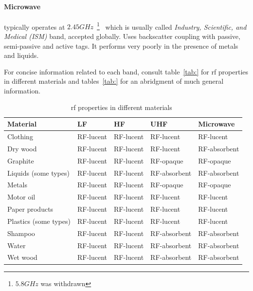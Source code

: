 \paragraph*{Microwave} typically operates at $2.45GHz$~\footnote{$5.8GHz$ was withdrawn}~\cite{isoISOIEC180004} which is usually called \emph{Industry, Scientific, and Medical (ISM)} band, accepted globally. Uses backscatter coupling with passive, semi-passive and active tags. It performs very poorly in the presence of metals and liquids. 

For concise information related to each band, consult table~\ref{tab:} for \ac{rf} properties in different materials and tables~\ref{tab:} for an abridgment of much general information.

\begin{table}[!htb]
    \centering
    \caption{\ac{rf} properties in different materials~\cite{lahiriRFIDSourcebook2005}}
    \begin{tabular}{|l|l|l|l|l|}
    \hline
    \textbf{Material}     & \textbf{LF} & \textbf{HF} & \textbf{UHF} & \textbf{Microwave} \\ \hline
    Clothing              & RF-lucent   & RF-lucent   & RF-lucent    & RF-lucent          \\ \hline
    Dry wood              & RF-lucent   & RF-lucent   & RF-lucent    & RF-absorbent       \\ \hline
    Graphite              & RF-lucent   & RF-lucent   & RF-opaque    & RF-opaque          \\ \hline
    Liquids (some types)  & RF-lucent   & RF-lucent   & RF-absorbent & RF-absorbent       \\ \hline
    Metals                & RF-lucent   & RF-lucent   & RF-opaque    & RF-opaque          \\ \hline
    Motor oil             & RF-lucent   & RF-lucent   & RF-lucent    & RF-lucent          \\ \hline
    Paper products        & RF-lucent   & RF-lucent   & RF-lucent    & RF-lucent          \\ \hline
    Plastics (some types) & RF-lucent   & RF-lucent   & RF-lucent    & RF-lucent          \\ \hline
    Shampoo               & RF-lucent   & RF-lucent   & RF-absorbent & RF-absorbent       \\ \hline
    Water                 & RF-lucent   & RF-lucent   & RF-absorbent & RF-absorbent       \\ \hline
    Wet wood              & RF-lucent   & RF-lucent   & RF-absorbent & RF-absorbent       \\ \hline
    \end{tabular}
    \label{tab:rfproperties}
\end{table}

